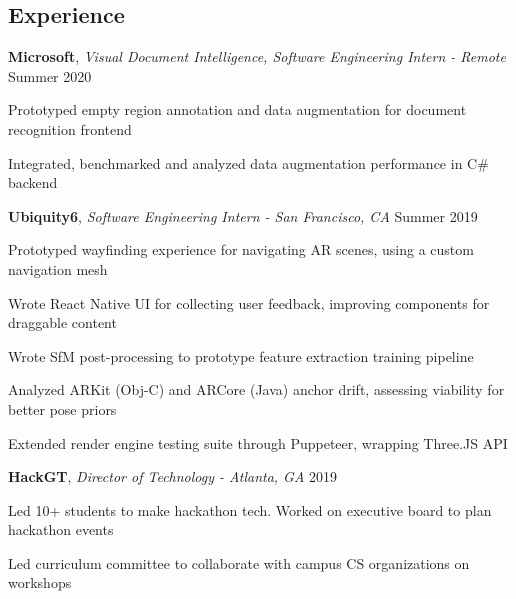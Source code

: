 \subsection*{Experience}
\headerrow
    {\textbf{Microsoft}, \emph{Visual Document Intelligence, Software Engineering Intern - Remote}}
    {Summer 2020}
\begin{itemize*}
	\item Prototyped empty region annotation and data augmentation for document recognition frontend
    \item Integrated, benchmarked and analyzed data augmentation performance in C\# backend
\end{itemize*}
\headerrow
	{\textbf{Ubiquity6}, \emph{Software Engineering Intern - San Francisco, CA}}
    {Summer 2019}
\begin{itemize*}
	\item Prototyped wayfinding experience for navigating AR scenes, using a custom navigation mesh
    \item Wrote React Native UI for collecting user feedback, improving components for draggable content
    \item Wrote SfM post-processing to prototype feature extraction training pipeline
    \item Analyzed ARKit (Obj-C) and ARCore (Java) anchor drift, assessing viability for better pose priors
    \item Extended render engine testing suite through Puppeteer, wrapping Three.JS API
\end{itemize*}
\headerrow
    {\textbf{HackGT}, \emph{Director of Technology - Atlanta, GA}}
    {2019}
\begin{itemize*}
    \item Led 10+ students to make hackathon tech. Worked on executive board to plan hackathon events
    \item Led curriculum committee to collaborate with campus CS organizations on workshops
\end{itemize*}

